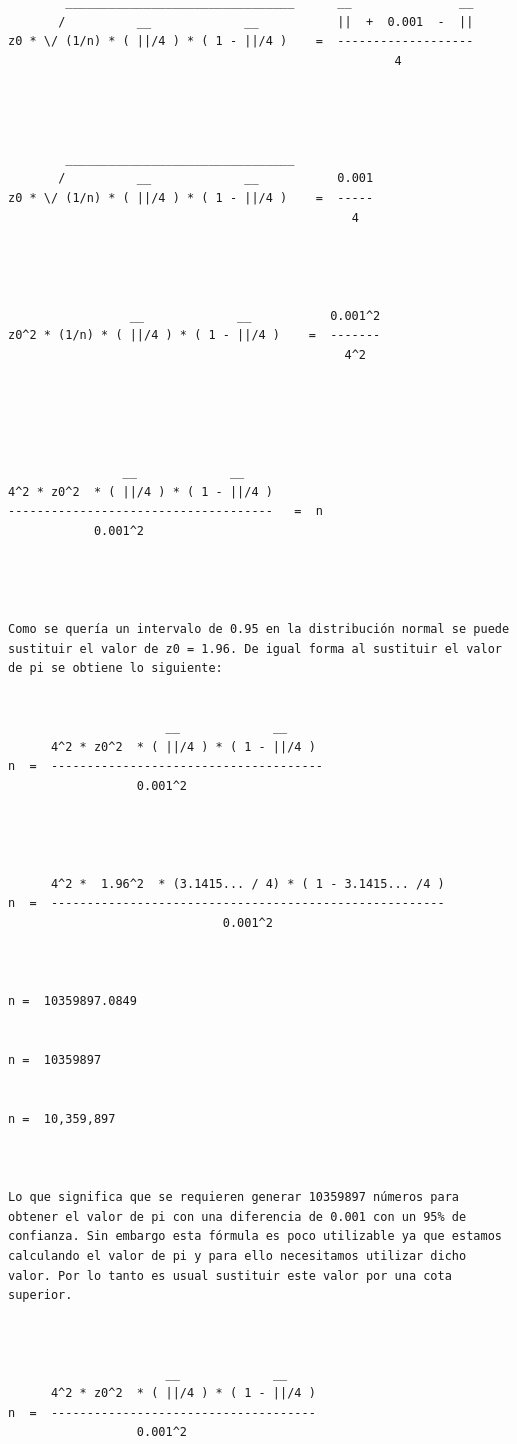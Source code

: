 \begin{verbatim}
        ________________________________      __               __
       /          __             __           ||  +  0.001  -  ||
z0 * \/ (1/n) * ( ||/4 ) * ( 1 - ||/4 )    =  -------------------
                                                      4




        ________________________________
       /          __             __           0.001
z0 * \/ (1/n) * ( ||/4 ) * ( 1 - ||/4 )    =  -----
                                                4



 
                 __             __           0.001^2
z0^2 * (1/n) * ( ||/4 ) * ( 1 - ||/4 )    =  -------
                                               4^2
   




                __             __
4^2 * z0^2  * ( ||/4 ) * ( 1 - ||/4 )
-------------------------------------   =  n
            0.001^2
            



Como se quería un intervalo de 0.95 en la distribución normal se puede sustituir el valor de z0 = 1.96. De igual forma al sustituir el valor de pi se obtiene lo siguiente:


                      __             __
      4^2 * z0^2  * ( ||/4 ) * ( 1 - ||/4 )
n  =  --------------------------------------
                  0.001^2



   
      4^2 *  1.96^2  * (3.1415... / 4) * ( 1 - 3.1415... /4 )
n  =  -------------------------------------------------------
                              0.001^2



n =  10359897.0849


n =  10359897


n =  10,359,897



Lo que significa que se requieren generar 10359897 números para obtener el valor de pi con una diferencia de 0.001 con un 95% de confianza. Sin embargo esta fórmula es poco utilizable ya que estamos calculando el valor de pi y para ello necesitamos utilizar dicho valor. Por lo tanto es usual sustituir este valor por una cota superior.



                      __             __
      4^2 * z0^2  * ( ||/4 ) * ( 1 - ||/4 )
n  =  -------------------------------------
                  0.001^2





\end{verbatim}
